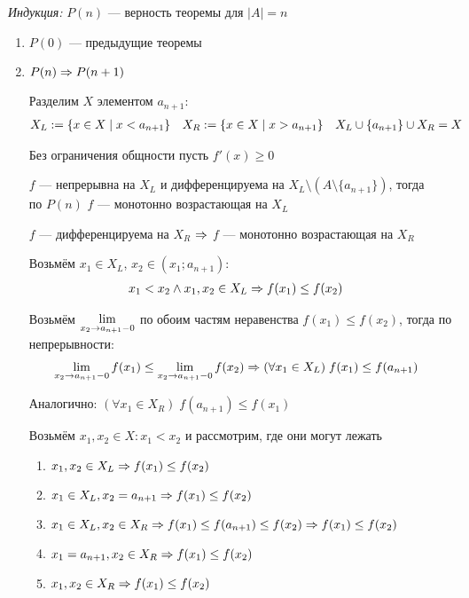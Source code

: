 \documentclass{article}
\begin{document}
{\it Индукция:} $P(n)$ --- верность теоремы для $|A|=n$
\begin{enumerate}
	\item{}$P(0)$ --- предыдущие теоремы
	\item{}$P(n)\Rightarrow P(n+1)$

	Разделим $X$ элементом $a_{n+1}$:
	\begin{align*}
		 & X_{L}:=\{x\in X\;|\;x<a_{n+1}\} &  & X_{R}:=\{x\in X\;|\;x> a_{n+1}\} &  & X_{L}\cup\{a_{n+1}\}\cup X_{R}=X
	\end{align*}

	\onlyif

	Без ограничения общности пусть $f'(x)\geq 0$

	$f$ --- непрерывна на $X_{L}$ и дифференцируема на $X_{L}\setminus (A\setminus \{a_{n+1}\})$, тогда\\
	по $P(n)$ $f$ --- монотонно возрастающая на $X_{L}$

	$f$ --- дифференцируема на $X_{R}$ $\Rightarrow$ $f$ --- монотонно возрастающая на $X_{R}$

	Возьмём $x_1\in X_{L}$, $x_2\in (x_1;a_{n+1})$:
	\begin{align*}
		 & x_1<x_2\land x_1,x_2\in X_{L}\Rightarrow f(x_1)\leq f(x_2)
	\end{align*}

	Возьмём $\lim\limits_{x_2\to a_{n+1}-0}$ по обоим частям неравенства $f(x_1)\leq f(x_2)$, тогда по непрерывности:
	\begin{align*}
		 & \lim\limits_{x_2\to a_{n+1}-0}f(x_1)\leq \lim\limits_{x_2\to a_{n+1}-0}f(x_2)\Rightarrow (\forall x_1\in X_{L})\;f(x_1)\leq f(a_{n+1})
	\end{align*}

	Аналогично: $(\forall x_1\in X_{R})\;f(a_{n+1})\leq f(x_1)$

	\pagebreak

	Возьмём $x_1,x_2\in X:x_1<x_2$ и рассмотрим, где они могут лежать
	\begin{enumerate}
		\item{}$x_1,x_2\in X_{L}\Rightarrow f(x_1)\leq f(x_2)$
		\item{}$x_1\in X_{L},x_2=a_{n+1}\Rightarrow f(x_1)\leq f(x_2)$
		\item{}$x_1\in X_{L},x_2\in X_{R}\Rightarrow f(x_1)\leq f(a_{n+1})\leq f(x_2)\Rightarrow f(x_1)\leq f(x_2)$
		\item{}$x_1=a_{n+1},x_2\in X_{R}\Rightarrow f(x_1)\leq f(x_2)$
		\item{}$x_1,x_2\in X_{R}\Rightarrow f(x_1)\leq f(x_2)$
	\end{enumerate}


\end{enumerate}
\end{document}
